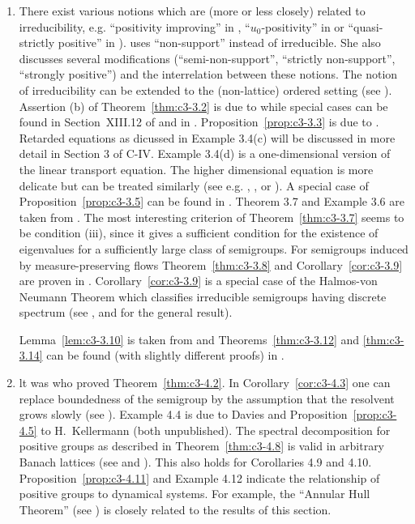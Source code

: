 \begin{enumerate}[label=\emph{Section \arabic*:}, wide, itemsep=1ex]
\item
There exist various notions which are (more or less closely) related to irreducibility, e.g. \enquote{positivity improving} in \citet{reedsimon:1979}, \enquote{$u_0$-positivity} in 
\citet{krasnoselskii:1964}
or \enquote{quasi-strictly positive} in \citet{karlin:1959}). \citet{sawashima:1964} uses \enquote{non-support} instead of irreducible. 
She also discusses several modifications (\enquote{semi-non-support}, \enquote{strictly non-support}, \enquote{strongly positive}) and the interrelation between these notions. 
The notion of irreducibility can be extended to the (non-lattice) ordered setting (see \citet{battyrobinson:1984}). 
Assertion (b) of Theorem~\ref{thm:c3-3.2} is due to \citet{majewskirobinson:1983} while special cases can be found in Section~XIII.12 of \citet{reedsimon:1979} and in \citet{kishimotorobinson:1981}. 
Proposition~\ref{prop:c3-3.3} is due to \citet{voigt:1984a}. 
Retarded equations as dicussed in Example 3.4(c) will be discussed in more detail in Section 3 of C-IV. Example 3.4(d) is a one-dimensional version of the linear transport equation. 
The higher dimensional equation is more delicate but can be treated similarly (see e.g. \citet{greiner:1984b}, \citet{kaperetal:1983a}, or \citet{voigt:1984b}). 
A special case of Proposition~\ref{prop:c3-3.5} can be found
%
in \citet{davies:1980}. 
Theorem 3.7 and Example 3.6 are taken from \citet{schaefer:1985}. 
The most interesting criterion of Theorem~\ref{thm:c3-3.7} seems to be condition (iii), since it gives a sufficient condition for the existence of eigenvalues for a sufficiently large class of semigroups. 
For semigroups induced by measure-preserving flows Theorem~\ref{thm:c3-3.8} and Corollary~\ref{cor:c3-3.9} are proven in \citet{cornfeldetal:1982}. 
Corollary~\ref{cor:c3-3.9} is a special case of the Halmos-von Neumann Theorem which classifies irreducible semigroups having discrete spectrum (see \citet{cornfeldetal:1982}, \citet{greiner:1982} and \citet{schaefer:1974} for the general result). 

Lemma~\ref{lem:c3-3.10} is taken from 
\citet{groh:1984b}
and Theorems~\ref{thm:c3-3.12} and \ref{thm:c3-3.14} can be found (with slightly different proofs) in \citet{greiner:1981}. 

\item 
lt was \citet{derndinger:1980} who proved Theorem~\ref{thm:c3-4.2}. 
In Corollary~\ref{cor:c3-4.3} one can replace boundedness of the semigroup by the assumption that the resolvent grows slowly (see \citet{greiner:1982}). 
Example 4.4 is due to Davies and Proposition~\ref{prop:c3-4.5} to H.~Kellermann (both unpublished). 
The spectral decomposition for positive groups as described in Theorem~\ref{thm:c3-4.8} is valid in arbitrary Banach lattices (see \citet{arendt:1982} and \citet{greiner:1984c}). 
This also holds for Corollaries 4.9 and 4.10. 
Proposition~\ref{prop:c3-4.11} and Example 4.12 indicate the relationship of positive groups to dynamical systems. 
For example, the \enquote{Annular Hull Theorem} (see \citet{chiconeswanson:1981}) is closely related to the results of this section.
\end{enumerate}

\RaggedRight

 